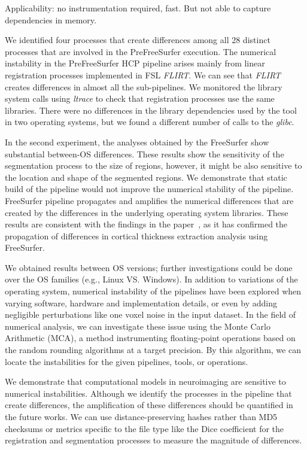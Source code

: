 \documentclass[a4paper,num-refs]{oup-contemporary}
\begin{document}
Applicability: no instrumentation required, fast.
But not able to capture dependencies in memory.

We identified four processes that create differences 
among all 28 distinct processes that are involved in the PreFreeSurfer execution. 
The numerical instability in the 
PreFreeSurfer HCP pipeline arises mainly from linear 
registration processes implemented in FSL \emph{FLIRT}. 
We can see that \emph{FLIRT} creates differences in almost all the sub-pipelines. 
We monitored the library system calls using \emph{ltrace} to check that registration processes
use the same libraries. There were no differences in the library dependencies used by 
the tool in two operating systems, but we found a different number of calls to the \emph{glibc}.

In the second experiment, 
the analyses obtained by the FreeSurfer show substantial between-OS differences.
These results show the sensitivity of the segmentation process to the 
size of regions, however, it might be also sensitive to the location and shape of 
the segmented regions.
We demonstrate that static build of the pipeline would not improve the numerical stability of the pipeline. 
FreeSurfer pipeline propagates and amplifies the numerical differences that are created by the 
differences in the underlying operating system libraries.
These results are consistent with the findings in the paper~\cite{Glatard2015}, 
as it has confirmed the propagation of differences in cortical thickness extraction analysis using FreeSurfer.

We obtained results between OS versions; further investigations could be done over the OS families (e.g., Linux VS. Windows).
In addition to variations of the operating system, numerical instability of the pipelines have been 
explored when varying software, hardware and implementation details, or even by adding negligible 
perturbations like one voxel noise in the input dataset.
In the field of numerical analysis, we can investigate these issue using the Monte Carlo Arithmetic (MCA), 
a method instrumenting floating-point operations based on the random rounding algorithms at a target precision.
By this algorithm, we can locate the instabilities for the given pipelines, tools, or operations.

We demonstrate that computational models in neuroimaging are sensitive to numerical instabilities. 
Although we identify the processes in the pipeline that create differences, 
the amplification of these differences should be quantified in the future works.
We can use distance-preserving hashes rather than MD5 checksums or metrics specific to the file type like the Dice coefficient 
for the registration and segmentation processes to measure the magnitude of differences. 
\end{document}
